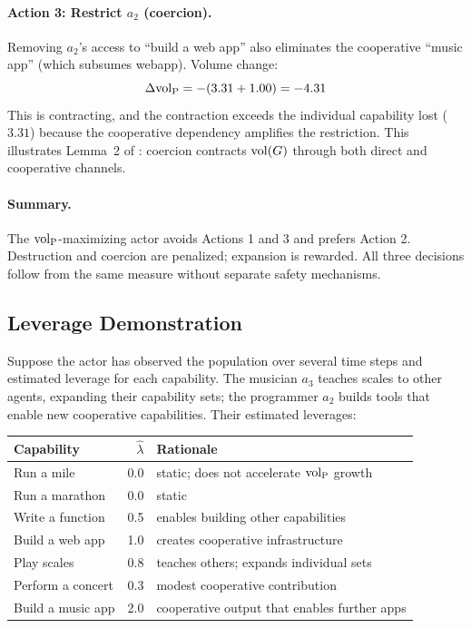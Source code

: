 \paragraph{Action 3: Restrict $a_2$ (coercion).} Removing $a_2$'s access to
``build a web app'' also eliminates the cooperative ``music app'' (which
subsumes webapp). Volume change:
\[
\Delta {\operatorname{vol}_{\mathrm{P}}} = -(3.31 + 1.00) = -4.31
\]
This is contracting, and the contraction exceeds the individual capability lost
($3.31$) because the cooperative dependency amplifies the restriction. This
illustrates Lemma~2 of \citet{lasser2026gfm}: coercion contracts $\operatorname{vol}(G)$
through both direct and cooperative channels.

\paragraph{Summary.} The ${\operatorname{vol}_{\mathrm{P}}}$-maximizing actor avoids Actions 1 and 3 and
prefers Action 2. Destruction and coercion are penalized; expansion is
rewarded. All three decisions follow from the same measure without separate
safety mechanisms.

\subsection{Leverage Demonstration}

Suppose the actor has observed the population over several time steps and
estimated leverage for each capability. The musician $a_3$ teaches scales to
other agents, expanding their capability sets; the programmer $a_2$ builds
tools that enable new cooperative capabilities. Their estimated leverages:

\begin{center}
\begin{tabular}{@{}lrl@{}}
\toprule
\textbf{Capability} & $\hat{\lambda}$ & \textbf{Rationale} \\
\midrule
Run a mile        & 0.0 & static; does not accelerate ${\operatorname{vol}_{\mathrm{P}}}$ growth \\
Run a marathon    & 0.0 & static \\
Write a function  & 0.5 & enables building other capabilities \\
Build a web app   & 1.0 & creates cooperative infrastructure \\
Play scales       & 0.8 & teaches others; expands individual sets \\
Perform a concert & 0.3 & modest cooperative contribution \\
Build a music app & 2.0 & cooperative output that enables further apps \\
\bottomrule
\end{tabular}
\end{center}

